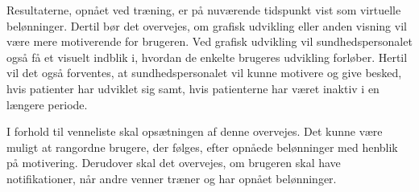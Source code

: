 Resultaterne, opnået ved træning, er på nuværende tidspunkt vist som virtuelle belønninger. Dertil bør det overvejes, om grafisk udvikling eller anden visning vil være mere motiverende for  brugeren. Ved grafisk udvikling vil sundhedspersonalet også få et visuelt indblik i, hvordan de enkelte brugeres udvikling forløber. Hertil vil det også forventes, at sundhedspersonalet vil kunne motivere og give besked, hvis patienter har udviklet sig samt, hvis patienterne har været inaktiv i en længere periode. 

I forhold til venneliste skal opsætningen af denne overvejes. Det kunne være muligt at rangordne brugere, der følges, efter opnåede belønninger med henblik på motivering. Derudover skal det overvejes, om brugeren skal have notifikationer, når andre venner træner og har opnået belønninger. 